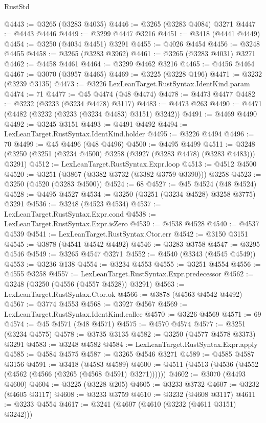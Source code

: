 \begin{lexlean}{RustStd}
\begin{coremodule}
@4443 := @3265 (@3283 @4035)
@4446 := @3265 (@3283 @4084) @3271
@4447 := @4443 @4446
@4449 := @3299 @4447 @3216
@4451 := @3418 (@4441 @4449)
@4454 := @3250 (@4034 @4451) @3291
@4455 := @4026 @4454
@4456 := @3248 @4455
@4458 := @3265 (@3283 @3962)
@4461 := @3265 (@3283 @4031) @3271
@4462 := @4458 @4461
@4464 := @3299 @4462 @3216
@4465 := @4456 @4464
@4467 := @3070 (@3957 @4465)
@4469 := @3225 (@3228 @196)
@4471 := @3232 (@3239 @3135)
@4473 := @3226 LexLeanTarget.RustSyntax.IdentKind.param
@4474 := 71
@4477 := @45 @4474 (@48 @4474)
@4478 := @4473 @4477
@4482 := @3232 (@3233 (@3234 @4478) @3117)
@4483 := @4473 @263
@4490 := @4471 (@4482 (@3232 (@3233 (@3234 @4483) @3151) @3242))
@4491 := @4469 @4490
@4492 := @3245 @3151
@4493 := @4491 @4492
@4494 := LexLeanTarget.RustSyntax.IdentKind.holder
@4495 := @3226 @4494
@4496 := 70
@4499 := @45 @4496 (@48 @4496)
@4500 := @4495 @4499
@4511 := @3248 (@3250 (@3251 (@3234 @4500) @3258 (@3927 (@3283 @4478) (@3283 @4483))) @3291)
@4512 := LexLeanTarget.RustSyntax.Expr.loop
@4513 := @4512 @4500
@4520 := @3251 (@3867 (@3382 @3732 (@3382 @3759 @3390))) @3258
@4523 := @3250 (@4520 (@3283 @4500))
@4524 := 68
@4527 := @45 @4524 (@48 @4524)
@4528 := @4495 @4527
@4534 := @3250 (@3251 (@3234 @4528) @3258 @3775) @3291
@4536 := @3248 (@4523 @4534)
@4537 := LexLeanTarget.RustSyntax.Expr.cond
@4538 := LexLeanTarget.RustSyntax.Expr.isZero
@4539 := @4538 @4528
@4540 := @4537 @4539
@4541 := LexLeanTarget.RustSyntax.Ctor.err
@4542 := @3150 @3151
@4545 := @3878 (@4541 @4542 @4492)
@4546 := @3283 @3758
@4547 := @3295 @4546
@4549 := @3265 @4547 @3271
@4552 := @4540 (@3343 (@4545 @4549))
@4553 := @3236 @138
@4554 := @3234 @4553
@4555 := @3251 @4554
@4556 := @4555 @3258
@4557 := LexLeanTarget.RustSyntax.Expr.predecessor
@4562 := @3248 (@3250 (@4556 (@4557 @4528)) @3291)
@4563 := LexLeanTarget.RustSyntax.Ctor.ok
@4566 := @3878 (@4563 @4542 @4492)
@4567 := @3774 @4553
@4568 := @3927 @4567
@4569 := LexLeanTarget.RustSyntax.IdentKind.callee
@4570 := @3226 @4569
@4571 := 69
@4574 := @45 @4571 (@48 @4571)
@4575 := @4570 @4574
@4577 := @3251 (@3234 @4575)
@4578 := @3735 @3135
@4582 := @3250 (@4577 @4578 @3373) @3291
@4583 := @3248 @4582
@4584 := LexLeanTarget.RustSyntax.Expr.apply
@4585 := @4584 @4575
@4587 := @3265 @4546 @3271
@4589 := @4585 @4587 @3156
@4591 := @3418 (@4583 @4589)
@4600 := @4511 (@4513 (@4536 (@4552 (@4562 (@4566 (@3265 (@4568 @4591) @3271))))))
@4602 := @3070 (@4493 @4600)
@4604 := @3225 (@3228 @205)
@4605 := @3233 @3732
@4607 := @3232 (@4605 @3117)
@4608 := @3233 @3759
@4610 := @3232 (@4608 @3117)
@4611 := @3233 @4554
@4617 := @3241 (@4607 (@4610 (@3232 (@4611 @3151) @3242)))

\end{coremodule}
\end{lexlean}
